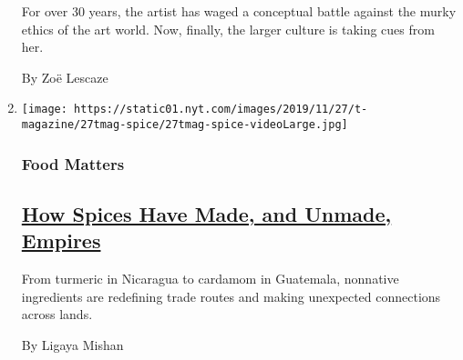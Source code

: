 \begin{enumerate}
  For over 30 years, the artist has waged a conceptual battle against
  the murky ethics of the art world. Now, finally, the larger culture is
  taking cues from her.

  By Zoë Lescaze
\item
  \texttt{[image: https://static01.nyt.com/images/2019/11/27/t-magazine/27tmag-spice/27tmag-spice-videoLarge.jpg]}

  \hypertarget{food-matters}{%
  \subsubsection{Food Matters}\label{food-matters}}

  \hypertarget{how-spices-have-made-and-unmade-empires}{%
  \subsection{\texorpdfstring{\href{/2019/11/27/t-magazine/spices.html}{How
  Spices Have Made, and Unmade,
  Empires}}{How Spices Have Made, and Unmade, Empires}}\label{how-spices-have-made-and-unmade-empires}}

  From turmeric in Nicaragua to cardamom in Guatemala, nonnative
  ingredients are redefining trade routes and making unexpected
  connections across lands.

  By Ligaya Mishan
\end{enumerate}

